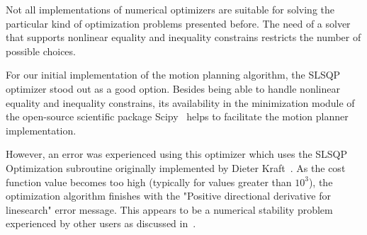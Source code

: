 





Not all implementations of numerical optimizers are suitable for solving
the particular kind of optimization problems presented before.
The need of a solver that supports nonlinear equality and inequality constrains
restricts the number of possible choices.

For our initial implementation of the motion planning algorithm, the
SLSQP optimizer stood out
as a good option. Besides being able to handle nonlinear equality and inequality 
constrains, its availability in the minimization module of the open-source
scientific package Scipy~\cite{Scipy} helps to facilitate the motion planner implementation.

However, an error was experienced using this optimizer which uses the SLSQP 
Optimization subroutine originally implemented by Dieter Kraft~\cite{Kraft1988}.
As the cost function value becomes too high (typically for values greater than 
$10^3$), the optimization algorithm finishes with the "Positive 
directional derivative for linesearch" error message. This appears to be
a numerical stability problem experienced by other users as discussed in~\cite{slsqperror}.

